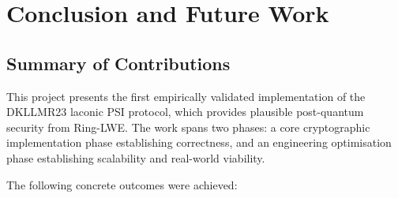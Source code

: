 \chapter{Conclusion and Future Work}

\section{Summary of Contributions}

This project presents the first empirically validated implementation of the DKLLMR23
laconic PSI protocol, which provides plausible post-quantum security from Ring-LWE.
The work spans two phases: a core cryptographic implementation phase establishing
correctness, and an engineering optimisation phase establishing scalability and
real-world viability.

The following concrete outcomes were achieved:

